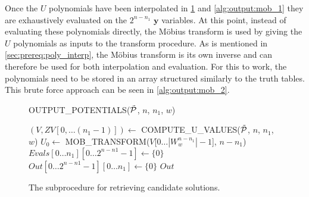 Once the $U$ polynomials have been interpolated in \cref{alg:output:mob_0} and \cref{alg:output:mob_1} they are exhaustively evaluated on the $2^{n - n_1}$ $\mathbf{y}$ variables. At this point, instead of evaluating these polynomials directly, the Möbius transform is used by giving the $U$ polynomials as inputs to the transform procedure. As is mentioned in \cref{sec:prereq:poly_interp}, the Möbius transform is its own inverse and can therefore be used for both interpolation and evaluation. For this to work, the polynomials need to be stored in an array structured similarly to the truth tables. This brute force approach can be seen in \cref{alg:output:mob_2}.

\begin{figure}[ht]
    \centering
    \begin{alg}
        \caption{OUTPUT\_POTENTIALS($\Tilde{\mathcal{P}}$, $n$, $n_1$, $w$)}
        \label{alg:output}
        $(V, ZV[0,\dots(n_1 - 1)]) \gets $ COMPUTE\_U\_VALUES($\Tilde{\mathcal{P}}$, $n$, $n_1$, $w$)\; \label{alg:output:uvalues}
        $U_0 \gets$ MOB\_TRANSFORM($V$[$0\dots |W^{n - n_1}_{w}| - 1$], $n - n_1$)\; \label{alg:output:mob_0}
        $Evals[0\dots n_1][0\dots 2^{n - n1} - 1] \gets \{0\}$\;
        $Out[0\dots 2^{n - n1} - 1][0\dots n_1] \gets \{0\}$\;
        \Return $Out$\;
    \end{alg}
    \caption{The subprocedure for retrieving candidate solutions.}
\end{figure}

